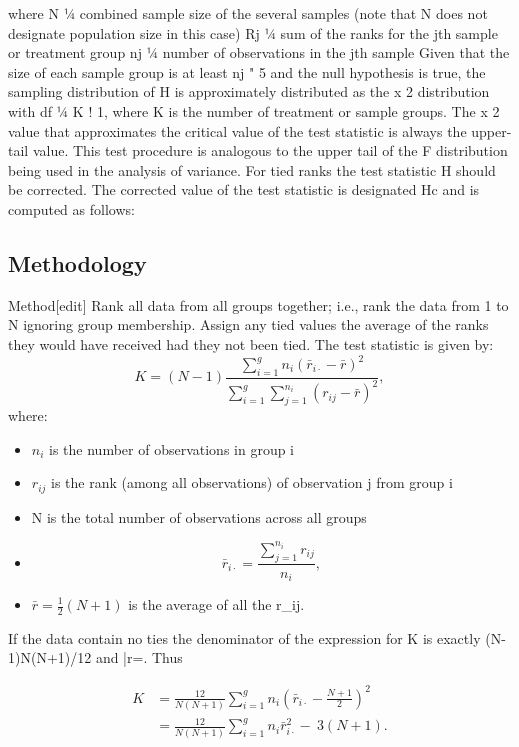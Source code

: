 where N ¼ combined sample size of the several samples
(note that N does not designate population size in this case)
Rj ¼ sum of the ranks for the jth sample or treatment group
nj ¼ number of observations in the jth sample
Given that the size of each sample group is at least nj " 5 and the null hypothesis is true, the sampling
distribution of H is approximately distributed as the x
2 distribution with df ¼ K ! 1, where K is the number
of treatment or sample groups. The x
2 value that approximates the critical value of the test statistic is
always the upper-tail value. This test procedure is analogous to the upper tail of the F distribution being
used in the analysis of variance.
For tied ranks the test statistic H should be corrected. The corrected value of the test statistic is designated
Hc and is computed as follows:

\subsection*{Methodology}
Method[edit]
Rank all data from all groups together; i.e., rank the data from 1 to N ignoring group membership. Assign any tied values the average of the ranks they would have received had they not been tied.
The test statistic is given by:
\[K = (N-1)\frac{\sum_{i=1}^g n_i(\bar{r}_{i\cdot} - \bar{r})^2}{\sum_{i=1}^g\sum_{j=1}^{n_i}(r_{ij} - \bar{r})^2},\] where:

\begin{itemize}
\item $n_i$ is the number of observations in group i
\item $r_{ij}$ is the rank (among all observations) of observation j from group i
\item N is the total number of observations across all groups
\item \[\bar{r}_{i\cdot} = \frac{\sum_{j=1}^{n_i}{r_{ij}}}{n_i},\]
\item $\bar{r} =\tfrac 12 (N+1)$ is the average of all the r_{ij}.
\end{itemize}

If the data contain no ties the denominator of the expression for K is exactly (N-1)N(N+1)/12 and \bar{r}=. Thus

\begin{align}
K & = \frac{12}{N(N+1)}\sum_{i=1}^g n_i \left(\bar{r}_{i\cdot} - \frac{N+1}{2}\right)^2 \\ & = \frac{12}{N(N+1)}\sum_{i=1}^g n_i \bar{r}_{i\cdot }^2 -\ 3(N+1).
\end{align}

